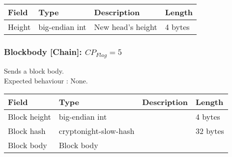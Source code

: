 \documentclass[a4paper,10pt]{article}
\begin{document}
                \noindent\begin{tabularx}{\textwidth}{|l|l|X|l|}
                    \hline Field & Type & Description & Length \\ \hline
                    \hline Height & big-endian int & New head's height & 4 bytes \\
                    \hline
                \end{tabularx}
            
            \subsubsection{Blockbody [Chain]: $CP_{Flag} = 5$}
                Sends a block body.\\
                Expected behaviour : None.\\
                
                \noindent\begin{tabularx}{\textwidth}{|l|l|X|l|}
                    \hline Field & Type & Description & Length \\ \hline
                    \hline Block height & big-endian int & & 4 bytes \\
                    \hline Block hash & cryptonight-slow-hash & & 32 bytes\\
                    \hline Block body & Block body& & \\
                    \hline
                \end{tabularx}
\end{document}
